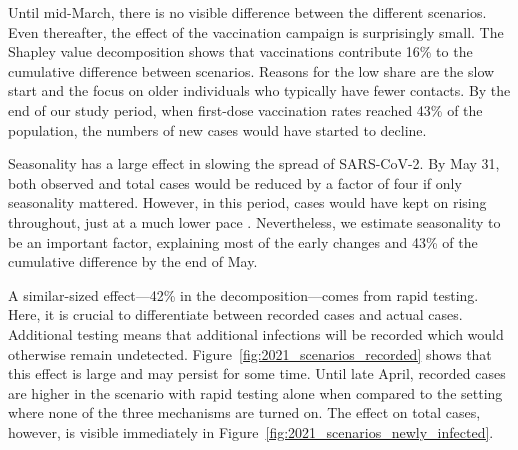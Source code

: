 \begin{figure}[!tp]
\end{figure}

Until mid-March, there is no visible difference between the different scenarios.
Even thereafter, the effect of the vaccination campaign is surprisingly small.
The Shapley value decomposition shows that vaccinations contribute 16\% to the
cumulative difference between scenarios. Reasons for the low share are the slow
start and the focus on older individuals who typically have fewer contacts.
By the end of our study period, when first-dose
vaccination rates reached 43\% of the population, the numbers of new cases would have
started to decline.


Seasonality has a large effect in slowing the spread of SARS-CoV-2. By May 31, both
observed and total cases would be reduced by a factor of four if only seasonality
mattered. However, in this period, cases would have kept on rising throughout, just at a
much lower pace \citep[this is in line with results in][, which our seasonality measure
is based on]{Gavenciak2021}. Nevertheless, we estimate seasonality to be an
important factor, explaining most of the early changes and 43\% of the cumulative
difference by the end of May.

A similar-sized effect---42\% in the decomposition---comes from rapid testing. Here, it
is crucial to differentiate between recorded cases and actual cases. Additional testing
means that additional infections will be recorded which would otherwise remain
undetected. Figure~\ref{fig:2021_scenarios_recorded} shows that this effect is large and
may persist for some time. Until late April, recorded cases are higher in the scenario
with rapid testing alone when compared to the setting where none of the three mechanisms
are turned on. The effect on total cases, however, is visible immediately in
Figure~\ref{fig:2021_scenarios_newly_infected}.

